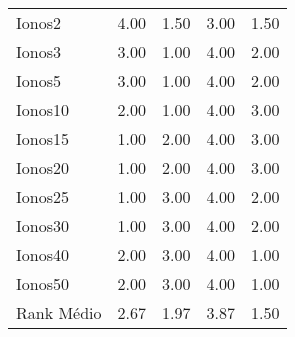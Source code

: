 \begin{table}
\begin{tabular}{lrrrr}
Ionos2     &                 4.00 &   1.50 &               3.00 &    1.50 \\
Ionos3     &                 3.00 &   1.00 &               4.00 &    2.00 \\
Ionos5     &                 3.00 &   1.00 &               4.00 &    2.00 \\
Ionos10    &                 2.00 &   1.00 &               4.00 &    3.00 \\
Ionos15    &                 1.00 &   2.00 &               4.00 &    3.00 \\
Ionos20    &                 1.00 &   2.00 &               4.00 &    3.00 \\
Ionos25    &                 1.00 &   3.00 &               4.00 &    2.00 \\
Ionos30    &                 1.00 &   3.00 &               4.00 &    2.00 \\
Ionos40    &                 2.00 &   3.00 &               4.00 &    1.00 \\
Ionos50    &                 2.00 &   3.00 &               4.00 &    1.00 \\
Rank Médio &                 2.67 &   1.97 &               3.87 &    1.50 \\
\bottomrule
\end{tabular}
\end{table}
